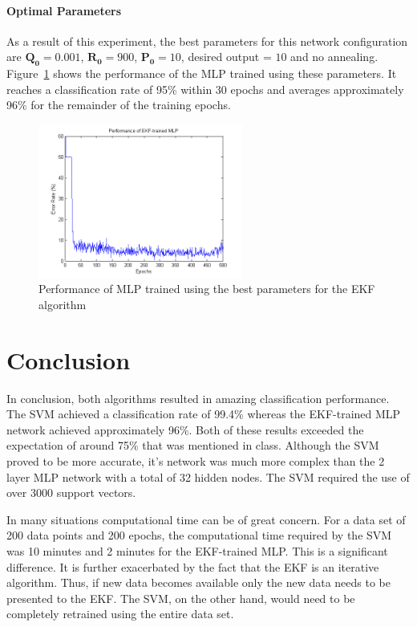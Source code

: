 \documentclass[11pt,letterpaper,titlepage]{article}
\numberwithin{equation}{section}
\numberwithin{figure}{section}
\numberwithin{table}{section}
\begin{document}
\paragraph{Optimal Parameters}

As a result of this experiment, the best parameters for this network configuration are \(\mathbf{Q_0} = 0.001\), \(\mathbf{R_0} = 900\), \(\mathbf{P_0} = 10\), desired output = \(10\) and no annealing. Figure~\ref{fig:mlpekf_best_perf} shows the performance of the MLP trained using these parameters. It reaches a classification rate of 95\% within 30 epochs and averages approximately 96\% for the remainder of the training epochs.

\begin{figure}[H]
  \centering
  \includegraphics[width=0.6\textwidth]{img/mlpekf_best_perf}
  \caption{Performance of MLP trained using the best parameters for the EKF algorithm}
  \label{fig:mlpekf_best_perf}
\end{figure}

\section{Conclusion}
In conclusion, both algorithms resulted in amazing classification performance. The SVM achieved a classification rate of 99.4\% whereas the EKF-trained MLP network achieved approximately 96\%. Both of these results exceeded the expectation of around 75\% that was mentioned in class. Although the SVM proved to be more accurate, it's network was much more complex than the 2 layer MLP network with a total of 32 hidden nodes. The SVM required the use of over 3000 support vectors.

In many situations computational time can be of great concern. For a data set of 200 data points and 200 epochs, the computational time required by the SVM was 10 minutes and 2 minutes for the EKF-trained MLP. This is a significant difference. It is further exacerbated by the fact that the EKF is an iterative algorithm. Thus, if new data becomes available only the new data needs to be presented to the EKF. The SVM, on the other hand, would need to be completely retrained using the entire data set.
\end{document}
